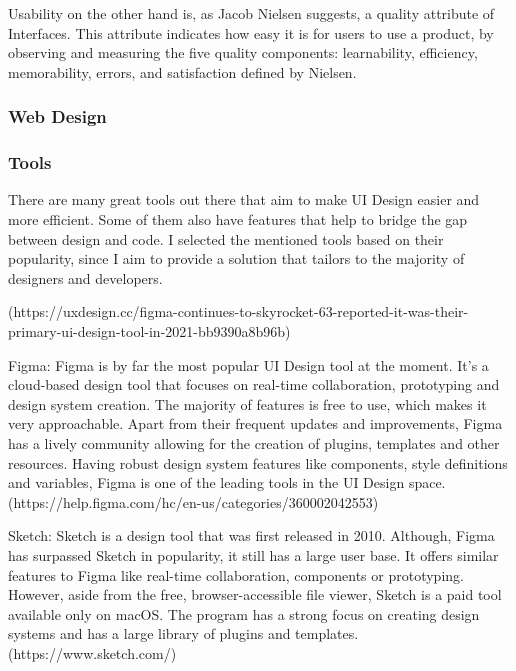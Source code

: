         Usability on the other hand is, as Jacob Nielsen suggests, a quality attribute of Interfaces. 
        This attribute indicates how easy it is for users to use a product, by observing and measuring 
        the five quality components: learnability, efficiency, memorability, errors, and satisfaction %
        defined by Nielsen. 

        \subsubsection{Web Design}

        \subsubsection{Tools}
        There are many great tools out there that aim to make UI Design easier and more efficient. Some of them also have features that 
        help to bridge the gap between design and code. I selected the mentioned tools based on their popularity, since I aim to provide a solution that tailors to the majority of designers and developers.

        (https://uxdesign.cc/figma-continues-to-skyrocket-63-reported-it-was-their-primary-ui-design-tool-in-2021-bb9390a8b96b)

        Figma:
        Figma is by far the most popular UI Design tool at the moment. It's a cloud-based design tool that focuses on real-time collaboration, prototyping and design system creation.
        The majority of features is free to use, which makes it very approachable. Apart from their frequent updates and improvements, Figma has a lively community allowing for the creation of plugins, templates and other resources.
        Having robust design system features like components, style definitions and variables, Figma is one of the leading tools in the UI Design space. 
        (https://help.figma.com/hc/en-us/categories/360002042553)

        Sketch:
        Sketch is a design tool that was first released in 2010. Although, Figma has surpassed Sketch in popularity, it still has a large user base.
        It offers similar features to Figma like real-time collaboration, components or prototyping. However, aside from the free, browser-accessible file viewer, Sketch is a paid tool available only on macOS.
        The program has a strong focus on creating design systems and has a large library of plugins and templates.
        (https://www.sketch.com/)

